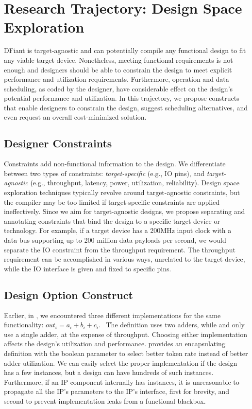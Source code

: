 \chapter{Research Trajectory: Design Space Exploration}
\label{chap:tarjectory_dsexplore}

DFiant is target-agnostic and can potentially compile any functional design to fit any viable target device. Nonetheless, meeting functional requirements is not enough and designers should be able to constrain the design to meet explicit performance and utilization requirements. Furthermore, operation and data scheduling, as coded by the designer, have considerable effect on the design's potential performance and utilization. In this trajectory, we propose constructs that enable designers to constrain the design, suggest scheduling alternatives, and even request an overall cost-minimized solution.
  
\section{Designer Constraints}
Constraints add non-functional information to the design. We differentiate between two types of constraints: \textit{target-specific} (e.g., IO pins), and \textit{target-agnostic} (e.g., throughput, latency, power, utilization, reliability). Design space exploration techniques typically revolve around target-agnostic constraints, but the compiler may be too limited if target-specific constraints are applied ineffectively.
Since we aim for target-agnostic designs, we propose separating and annotating constraints that bind the design to a specific target device or technology. For example, if a target device has a 200MHz input clock with a data-bus supporting up to 200 million data payloads per second, we would separate the IO constraint from the throughput requirement. The throughput requirement can be accomplished in various ways, unrelated to the target device, while the IO interface is given and fixed to specific pins. 
  

\section{Design Option Construct}
Earlier, in , we encountered three different implementations for the same functionality: $out_i=a_i+b_i+c_i$.~ The definition  uses two adders, while  and  only use a single adder, at the expense of throughput. Choosing either implementation affects the design's utilization and performance.  provides an encapsulating definition with the boolean parameter  to select better token rate instead of better adder utilization. We can easily select the proper implementation if the design has a few  instances, but a design can have hundreds of such instances. Furthermore, if an IP component internally has  instances, it is unreasonable to propagate all the IP's  parameters to the IP's interface, first for brevity, and second to prevent implementation leaks from a functional blackbox.

